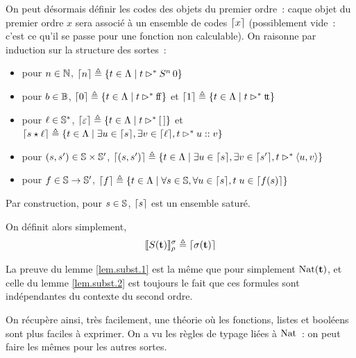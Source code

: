 \documentclass{article}
\begin{document}
On peut désormais définir les codes des objets du premier ordre~: caque objet du premier ordre $x$ sera associé à un ensemble de codes $\lceil x \rceil$ (possiblement vide~: c'est ce qu'il se passe pour une fonction non calculable). On raisonne par induction sur la structure des sortes~:
\begin{itemize}
    \item pour $n\in\mathbb{N}$, $\lceil n \rceil \triangleq \{t\in\Lambda \mid t \rhd^* S^n\,0\}$
    \item pour $b \in \mathbb{B}$, $\lceil 0 \rceil \triangleq \{t\in\Lambda\mid t \rhd^* \mathrm{f}\!\mathrm{f}\}$ et $\lceil 1 \rceil \triangleq \{t \in \Lambda\mid t \rhd^* \mathrm{t}\!\mathrm{t}\}$
    \item pour $\ell \in \mathbb{S}^*$, $\lceil \varepsilon \rceil \triangleq \{t\in\Lambda \mid t\rhd^* [\,]\}$ et $\lceil s\star \ell \rceil \triangleq \{t \in \Lambda\mid\exists u \in \lceil s \rceil,\exists v \in \lceil \ell \rceil,t \rhd^* u::v\}$
    \item pour $(s,s') \in \mathbb{S}\times \mathbb{S}'$, $\lceil (s,s') \rceil \triangleq \{t\in \Lambda\mid \exists u \in \lceil s \rceil, \exists v \in \lceil s' \rceil, t \rhd^* \langle u,v\rangle\}$
    \item pour $f \in \mathbb{S}\to \mathbb{S}'$, $\lceil f \rceil \triangleq \{t \in \Lambda\mid \forall s \in \mathbb{S}, \forall u \in \lceil s \rceil, t\;u \in \lceil f(s) \rceil\}$
\end{itemize}
Par construction, pour $s\in \mathbb{S}$, $\lceil s \rceil$ est un ensemble saturé.

On définit alors simplement, 
\[\llbracket S(\mathbf{t}) \rrbracket_\rho^\sigma\triangleq \lceil \sigma(\mathbf{t}) \rceil\]

La preuve du lemme \ref{lem.subst.1} est la même que pour simplement $\mathrm{Nat}(\mathbf{t})$, et celle du lemme \ref{lem.subst.2} est toujours le fait que ces formules sont indépendantes du contexte du second ordre.

On récupère ainsi, très facilement, une théorie où les fonctions, listes et booléens sont plus faciles à exprimer. On a vu les règles de typage liées à $\mathrm{Nat}$~: on peut faire les mêmes pour les autres sortes.
\end{document}
